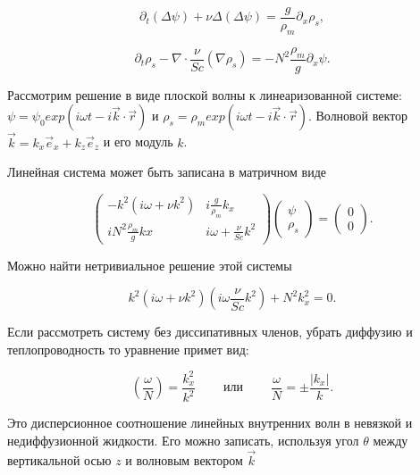 \begin{equation}
    \partial_t(\Delta \psi) + \nu \Delta (\Delta \psi) = \frac{g}{\rho_m} \partial_x \rho_s,
\end{equation}

\begin{equation}
    \partial_t \rho_s - \nabla \cdot \frac{\nu}{Sc} (\nabla \rho_s) = -N^2 \frac{\rho_m}{g}\partial_x \psi.
\end{equation}

Рассмотрим решение в виде плоской волны к линеаризованной системе: $\psi = \psi_0 exp(i\omega t - i \vec{k} \cdot \vec{r})$ и $\rho_s=\rho_m exp(i\omega t - i \vec{k}\cdot \vec{r})$. Волновой вектор $\vec{k}=k_x \vec{e}_x + k_z \vec{e}_z$ и его модуль $k$.

Линейная система может быть записана в матричном виде

\begin{equation}
    \left(\begin{array}{cc} -k^2(i\omega + \nu k^2) & i \frac{g}{\rho_m}k_x
    \\[15pt] iN^2 \frac{\rho_m}{g}kx & i\omega + \frac{\nu}{Sc} k^2 \end{array}\right)
    \left(\begin{array}{c}\psi \\[15pt] \rho_s\end{array}\right) = 
    \left(\begin{array}{c}0 \\[15pt] 0\end{array}\right).
\end{equation}

Можно найти нетривиальное решение этой системы

\begin{equation}
    k^2 \left( i\omega + \nu k^2 \right) \left(i \omega \frac{\nu}{Sc} k^2 \right) + N^2 k^2_x = 0.
\end{equation}

Если рассмотреть систему без диссипативных членов, убрать диффузию и теплопроводность то уравнение примет вид:

\begin{equation}
    \left(\frac{\omega}{N}\right)=\frac{k^2_x}{k^2} \;\;\;\;\;\;\;\; или \;\;\;\;\;\;\;\; \frac{\omega}{N}=\pm \frac{|k_x|}{k}.
\end{equation}

Это дисперсионное соотношение линейных внутренних волн в невязкой и недиффузионной жидкости. Его можно записать, используя угол $\theta$ между вертикальной осью $z$ и волновым вектором $\vec{k}$

